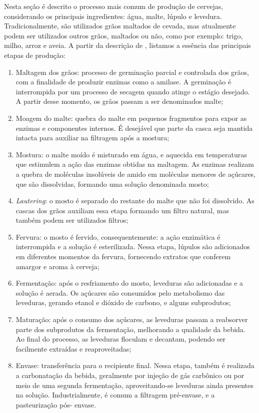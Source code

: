 Nesta seção é descrito o processo mais comum de produção de cervejas, considerando os principais
ingredientes: água, malte, lúpulo e levedura. Tradicionalmente, são utilizados grãos maltados de cevada,
mas atualmente podem ser utilizados outros grãos, maltados ou não, como por exemplo: trigo, milho, arroz e aveia.
A partir da descrição de , listamos a essência das principais etapas de produção:


\begin{enumerate}
    \item Maltagem dos grãos: processo de germinação parcial e controlada dos grãos, com a finalidade
de produzir enzimas como a amilase. A germinação é interrompida por um processo de secagem quando atinge o estágio desejado.
A partir desse momento, os grãos passam a ser denominados malte;
    \item Moagem do malte: quebra do malte em pequenos fragmentos para expor as enzimas e componentes internos. É desejável
que parte da casca seja mantida intacta para auxiliar na filtragem após a mostura;
    \item Mostura: o malte moído é misturado em água, e aquecida em temperaturas
que estimulem a ação das enzimas obtidas na maltagem. As enzimas
realizam a quebra de moléculas insolúveis de amido em moléculas menores
de açúcares, que são dissolvidas, formando uma solução denominada mosto;
    \item \textit{Lautering}: o mosto é separado do restante do malte que não foi dissolvido. As
cascas dos grãos auxiliam essa etapa formando um filtro natural, mas também podem ser utilizados filtros;
    \item Fervura: o mosto é fervido, consequentemente: a ação enzimática é
interrompida e a solução é esterilizada. Nessa etapa, lúpulos são adicionados em diferentes
momentos da fervura, fornecendo extratos que conferem amargor e aroma à cerveja;
    \item Fermentação: após o resfriamento do mosto, leveduras são adicionadas e a solução é aerada. 
Os açúcares são consumidos pelo metabolismo das leveduras, gerando etanol e dióxido de carbono, e alguns subprodutos;
    \item Maturação: após o consumo dos açúcares, as leveduras passam a reabsorver parte dos
subprodutos da fermentação, melhorando a qualidade da bebida. Ao final do processo, as leveduras floculam e decantam, podendo
ser facilmente extraídas e reaproveitadas;
    \item Envase: transferência para o recipiente final. Nessa etapa, também é
realizada a carbonatação da bebida, geralmente por injeção de gás carbônico
ou por meio de uma segunda fermentação, aproveitando-se leveduras ainda presentes na solução.
Industrialmente, é comum a filtragem pré-envase, e a pasteurização pós-
envase.
\end{enumerate}

